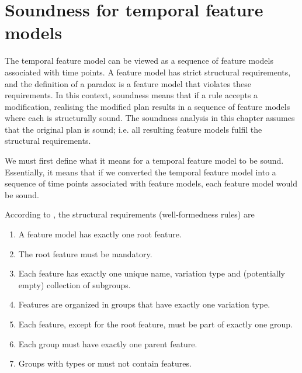 \section{Soundness for temporal feature models}
\label{sec:soundness-for-temporal-feature-models}
The temporal feature model can be viewed as a sequence of feature models associated with time points. A feature model has strict structural requirements, and the definition of a paradox is a feature model that violates these requirements. In this context, soundness means that if a rule accepts a modification, realising the modified plan results in a sequence of feature models where each is structurally sound. The soundness analysis in this chapter assumes that the original plan is sound; i.e. all resulting feature models fulfil the structural requirements. 

We must first define what it means for a temporal feature model to be sound. Essentially, it means that if we converted the temporal feature model into a sequence of time points associated with feature models, each feature model would be sound.

According to \cite{art:consistency-preserving-evolution-planning}, the structural requirements (well-formedness rules) are 
\begin{enumerate}[\itbf{WF\arabic*}, itemsep=0mm]
   \item A feature model has exactly one root feature.
   \item The root feature must be mandatory.
   \item Each feature has exactly one unique name, variation type and (potentially empty) collection of subgroups.
   \item Features are organized in groups that have exactly one variation type.
   \item Each feature, except for the root feature, must be part of exactly one group.
   \item Each group must have exactly one parent feature.
   \item Groups with types \xortype{} or \ortype{} must not contain \mandatory{} features.
\end{enumerate}

